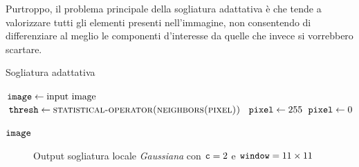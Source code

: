 Purtroppo, il problema principale della sogliatura adattativa \`e che tende a valorizzare tutti gli elementi presenti nell'immagine, non consentendo di differenziare al meglio le componenti d'interesse da quelle che invece si vorrebbero scartare.
\begin{algorithm}
	\caption{Sogliatura adattativa}
	\label{alg:thresh-local}
	\begin{algorithmic}[1]
			\State $\texttt{image} \gets \text{input image}$
			\\
				\State $\vars{thresh} \gets \textproc{statistical-operator(\textproc{neighbors(pixel)})}$
					\State $\texttt{pixel} \gets 255$
				\Else
					\State $\texttt{pixel} \gets 0$
				\EndIf
			\EndFor

			\Return $\texttt{image}$
		\EndFunction
	\end{algorithmic}
\end{algorithm}
\begin{figure}[H]
	\centering
	\caption{Output sogliatura locale \textit{Gaussiana} con $\texttt{c}=2$ e $\texttt{window}=11\times11$}
	\label{fig:image-bin-local}
\end{figure}

